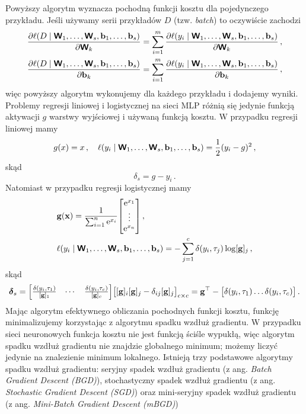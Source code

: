 \documentclass{myclass}
\begin{document}
Powyższy algorytm wyznacza pochodną funkcji kosztu dla pojedynczego przykładu. Jeśli używamy serii
przykładów \(D\) (tzw. \textit{batch}) to oczywiście zachodzi
\begin{equation*}
    \begin{split}
        &\pdv{\ell(D\mid \boldsymbol{\mathsf{W}}_1, \ldots,\boldsymbol{\mathsf{W}}_s, \mathbf{b}_1, \ldots, \mathbf{b}_s)}{\boldsymbol{\mathsf{W}}_k} = \sum_{i=1}^m \pdv{\ell(y_i\mid \boldsymbol{\mathsf{W}}_1, \ldots,\boldsymbol{\mathsf{W}}_s, \mathbf{b}_1, \ldots, \mathbf{b}_s)}{\boldsymbol{\mathsf{W}}_k}\,,\\
        &\pdv{\ell(D\mid \boldsymbol{\mathsf{W}}_1, \ldots,\boldsymbol{\mathsf{W}}_s, \mathbf{b}_1, \ldots, \mathbf{b}_s)}{\mathbf{b}_k} = \sum_{i=1}^m \pdv{\ell(y_i\mid \boldsymbol{\mathsf{W}}_1, \ldots,\boldsymbol{\mathsf{W}}_s, \mathbf{b}_1, \ldots, \mathbf{b}_s)}{\mathbf{b}_k}\,,
    \end{split}
\end{equation*}
więc powyższy algorytm wykonujemy dla każdego przykładu i dodajemy wyniki. Problemy regresji
liniowej i logistycznej na sieci MLP różnią się jedynie funkcją aktywacji \(g\) warstwy wyjściowej i
używaną funkcją kosztu. W przypadku regresji liniowej mamy
\begin{equation*}
    g(x) = x\,,\quad \ell(y_i \mid \boldsymbol{\mathsf{W}}_1, \ldots,\boldsymbol{\mathsf{W}}_s, \mathbf{b}_1, \ldots, \mathbf{b}_s ) = \frac{1}{2}(y_i - g)^2\,,
\end{equation*}
skąd
\begin{equation*}
    \delta_s = g - y_i\,.
\end{equation*}
Natomiast w przypadku regresji logistycznej mamy
\begin{equation*}
    \begin{split}
        &\mathbf{g}(\mathbf{x}) = \frac{1}{\sum_{i=1}^n \e^{x_i}}\mqty[\e^{x_1} \\ \vdots \\ \e^{x_n}]\,,\\
        &\ell(y_i \mid \oper{W}_1, \ldots,\oper{W}_s, \mathbf{b}_1, \ldots, \mathbf{b}_s) = -\sum_{j=1}^c \delta(y_i, \tau_j) \log [\mathbf{g}]_j\,,
    \end{split}
\end{equation*}
skąd
\begin{equation*}
    \boldsymbol{\delta}_s = \mqty[\frac{\delta(y_i, \tau_1)}{[\mathbf{g}]_1} & \cdots & \frac{\delta(y_i, \tau_c)}{[\mathbf{g}]_c}] \mqty[[\mathbf{g}]_i[\mathbf{g}]_j - \delta_{ij}[\mathbf{g}]_j ]_{c\times c} = \mathbf{g}^\top - \mqty[\delta(y_i, \tau_1) \ldots \delta(y_i, \tau_c)]\,.
\end{equation*}
Mając algorytm efektywnego obliczania pochodnych funkcji kosztu, funkcję minimalizujemy korzystając
z algorytmu spadku wzdłuż gradientu. W przypadku sieci neuronowych funkcja kosztu nie jest funkcją
ściśle wypukłą, więc algorytm spadku wzdłuż gradientu nie znajdzie globalnego minimum; możemy liczyć
jedynie na znalezienie minimum lokalnego. Istnieją trzy podstawowe algorytmy spadku wzdłuż
gradientu: seryjny spadek wzdłuż gradientu (z ang. \textit{Batch Gradient Descent (BGD)}),
stochastyczny spadek wzdłuż gradientu (z ang. \textit{Stochastic Gradient Descent (SGD)}) oraz
mini-seryjny spadek wzdłuż gradientu (z ang. \textit{Mini-Batch Gradient Descent (mBGD)})
\end{document}
